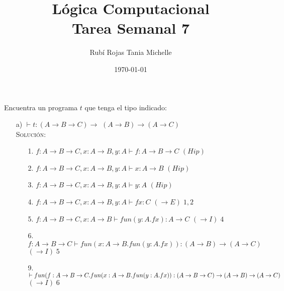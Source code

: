\documentclass[letterpaper,12pt]{article}
\title{Lógica Computacional \\ Tarea Semanal 7}
\author{Rubí Rojas Tania Michelle}
\date{\today}
\begin{document}
\maketitle

Encuentra un programa $t$ que tenga el tipo indicado:

\begin{enumerate}
    \item[a)] $\vdash t: (A \rightarrow B \rightarrow C) \rightarrow$ 
    $(A \rightarrow B) \rightarrow (A \rightarrow C)$ \\
    \textsc{Solución:}
    \begin{enumerate}
        \item[1.] $f: A \rightarrow B \rightarrow C, x: A \rightarrow B, y: A
        \vdash f: A \rightarrow B \rightarrow C$ \; \; \; $(Hip)$
        \item[2.] $f: A \rightarrow B \rightarrow C, x: A \rightarrow B, y: A
        \vdash x: A \rightarrow B$ \; \; \;  \; \; \; \; $(Hip)$
        \item[3.] $f: A \rightarrow B \rightarrow C, x: A \rightarrow B, y: A
        \vdash y: A$ \; \; \; \; \; \; \; \; \; \;  \; $(Hip)$ 
        \item[4.] $f: A \rightarrow B \rightarrow C, x: A \rightarrow B, y: A
        \vdash fx: C$ \; \; \; \; \; \; \; \; \; \; $(\rightarrow E) \; 1,2$
        \item[5.] $f: A \rightarrow B \rightarrow C, x: A \rightarrow B
        \vdash fun(y: A.fx) : A \rightarrow C$ \; \; \;$(\rightarrow I) \; 4$
        \item[6.] $f: A \rightarrow B \rightarrow C \vdash fun(x: A \rightarrow B.fun(y: A.fx)) : 
        (A \rightarrow B) \rightarrow (A \rightarrow C)$ \; \; $(\rightarrow I) \; 5$
        \item[9.] $\vdash fun(f: A \rightarrow B \rightarrow C.
        fun(x: A \rightarrow B.fun(y: A.fx)) : \\
        (A \rightarrow B \rightarrow C) \rightarrow (A \rightarrow B) \rightarrow (A \rightarrow C)$ 
        \; \; \; \; \; \; \; \; \; \; \; \; \; $(\rightarrow I) \; 6$ 
    \end{enumerate}


\end{enumerate}
\end{document}
